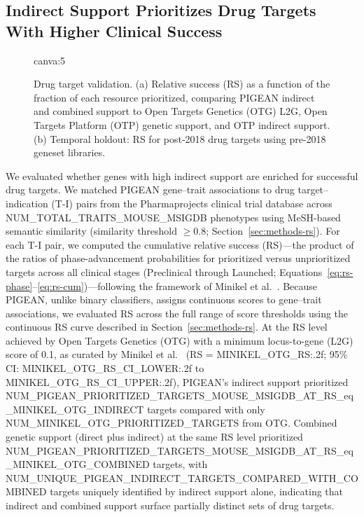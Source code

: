 \subsection{Indirect Support Prioritizes Drug Targets With Higher Clinical Success}

\begin{figure}[t!]
    \centering
    {{canva:5}}
    \caption{Drug target validation. (a) Relative success (RS) as a function of the fraction of each resource prioritized, comparing PIGEAN indirect and combined support to Open Targets Genetics (OTG) L2G, Open Targets Platform (OTP) genetic support, and OTP indirect support. (b) Temporal holdout: RS for post-2018 drug targets using pre-2018 geneset libraries.}
    \label{fig:validation-pharma}
\end{figure}

We evaluated whether genes with high indirect support are enriched for successful drug targets. We matched PIGEAN gene--trait associations to drug target--indication (T-I) pairs from the Pharmaprojects clinical trial database across {{NUM_TOTAL_TRAITS_MOUSE_MSIGDB}} phenotypes using MeSH-based semantic similarity (similarity threshold $\geq 0.8$; Section~\ref{sec:methods-rs}). For each T-I pair, we computed the cumulative relative success (RS)---the product of the ratios of phase-advancement probabilities for prioritized versus unprioritized targets across all clinical stages (Preclinical through Launched; Equations~\ref{eq:rs-phase}--\ref{eq:rs-cum})---following the framework of Minikel et al.\ \cite{minikel_refining_2024}. Because PIGEAN, unlike binary classifiers, assigns continuous scores to gene--trait associations, we evaluated RS across the full range of score thresholds using the continuous RS curve described in Section~\ref{sec:methods-rs}. At the RS level achieved by Open Targets Genetics (OTG) with a minimum locus-to-gene (L2G) score of 0.1, as curated by Minikel et al.\ \cite{minikel_refining_2024} (RS = {{MINIKEL_OTG_RS:.2f}}; 95\% CI: {{MINIKEL_OTG_RS_CI_LOWER:.2f}} to {{MINIKEL_OTG_RS_CI_UPPER:.2f}}), PIGEAN's indirect support prioritized {{NUM_PIGEAN_PRIORITIZED_TARGETS_MOUSE_MSIGDB_AT_RS_eq_MINIKEL_OTG_INDIRECT}} targets compared with only {{NUM_MINIKEL_OTG_PRIORITIZED_TARGETS}} from OTG. Combined genetic support (direct plus indirect) at the same RS level prioritized {{NUM_PIGEAN_PRIORITIZED_TARGETS_MOUSE_MSIGDB_AT_RS_eq_MINIKEL_OTG_COMBINED}} targets, with {{NUM_UNIQUE_PIGEAN_INDIRECT_TARGETS_COMPARED_WITH_COMBINED}} targets uniquely identified by indirect support alone, indicating that indirect and combined support surface partially distinct sets of drug targets.

